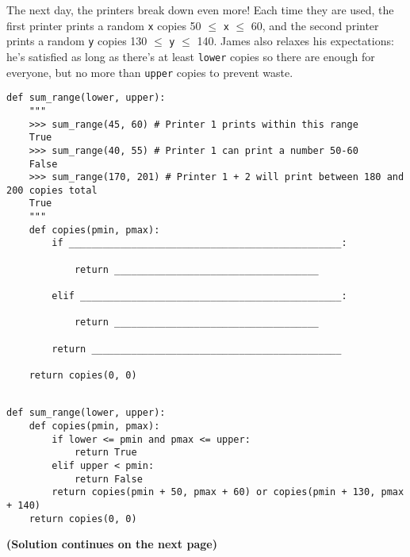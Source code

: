 \begin{blocksection}
\question The next day, the printers break down even more! Each time they are used, the first printer 
prints a random \lstinline$x$ copies 50 $\leq$ \lstinline$x$ $\leq$ 60, and the second printer prints a 
random \lstinline$y$ copies 130 $\leq$ \lstinline$y$ $\leq$ 140. James also relaxes his expectations: he's
satisfied as long as there's at least \lstinline$lower$ copies so there are enough for everyone, but no
more than \lstinline$upper$ copies to prevent waste. \\

\begin{lstlisting}
def sum_range(lower, upper):
    """
    >>> sum_range(45, 60) # Printer 1 prints within this range
    True
    >>> sum_range(40, 55) # Printer 1 can print a number 50-60
    False
    >>> sum_range(170, 201) # Printer 1 + 2 will print between 180 and 200 copies total
    True
    """
    def copies(pmin, pmax):
        if ________________________________________________:
				
            return ____________________________________
						
        elif ______________________________________________:
				
            return ____________________________________
						
        return ____________________________________________
				
    return copies(0, 0)
    
\end{lstlisting}

\begin{solution}[1.5in]
\begin{lstlisting}
def sum_range(lower, upper):
    def copies(pmin, pmax):
        if lower <= pmin and pmax <= upper:
            return True
        elif upper < pmin:
            return False
        return copies(pmin + 50, pmax + 60) or copies(pmin + 130, pmax + 140)
    return copies(0, 0)
\end{lstlisting}

\textbf{(Solution continues on the next page)}
\end{solution}
\end{blocksection}

